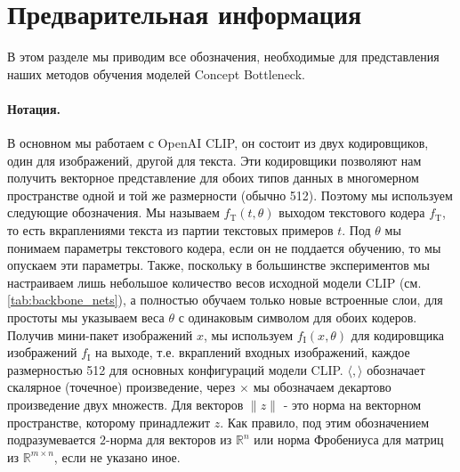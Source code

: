 \vspace{-0.3cm}
\section{Предварительная информация}\label{sec:prel}
\vspace{-0.2cm}

В этом разделе мы приводим все обозначения, необходимые для представления наших методов обучения моделей Concept Bottleneck.

\paragraph{Нотация.}\label{sec:notation} В основном мы работаем с OpenAI CLIP, он состоит из двух кодировщиков, один для изображений, другой для текста. Эти кодировщики позволяют нам получить векторное представление для обоих типов данных в многомерном пространстве одной и той же размерности (обычно 512). Поэтому мы используем следующие обозначения. Мы называем $f_{\mathrm{T}}(t, \theta)$ выходом текстового кодера $f_{\mathrm{T}}$, то есть вкраплениями текста из партии текстовых примеров $t$. Под $\theta$ мы понимаем параметры текстового кодера, если он не поддается обучению, то мы опускаем эти параметры. Также, поскольку в большинстве экспериментов мы настраиваем лишь небольшое количество весов исходной модели CLIP (см. \cref{tab:backbone_nets}), а полностью обучаем только новые встроенные слои, для простоты мы указываем веса $\theta$ с одинаковым символом для обоих кодеров. Получив мини-пакет изображений $x$, мы используем $f_{\mathrm{I}}(x, \theta)$ для кодировщика изображений $f_{\mathrm{I}}$ на выходе, т.е. вкраплений входных изображений, каждое размерностью 512 для основных конфигураций модели CLIP. $\langle , \rangle$ обозначает скалярное (точечное) произведение, через $\times$ мы обозначаем декартово произведение двух множеств. Для векторов $\|z\|$ - это норма на векторном пространстве, которому принадлежит $z$. Как правило, под этим обозначением подразумевается $2$-норма для векторов из $\mathbb{R}^{n}$ или норма Фробениуса для матриц из $\mathbb{R}^{m\times n}$, если не указано иное.